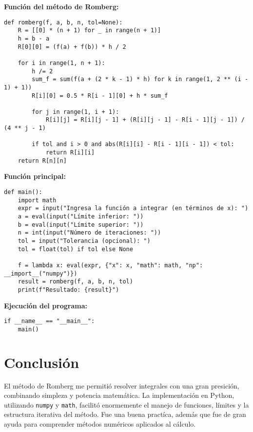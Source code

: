 \documentclass[12pt]{article}
\begin{document}
\textbf{Función del método de Romberg:}\\
\begin{lstlisting}
def romberg(f, a, b, n, tol=None):
    R = [[0] * (n + 1) for _ in range(n + 1)]
    h = b - a
    R[0][0] = (f(a) + f(b)) * h / 2

    for i in range(1, n + 1):
        h /= 2
        sum_f = sum(f(a + (2 * k - 1) * h) for k in range(1, 2 ** (i - 1) + 1))
        R[i][0] = 0.5 * R[i - 1][0] + h * sum_f

        for j in range(1, i + 1):
            R[i][j] = R[i][j - 1] + (R[i][j - 1] - R[i - 1][j - 1]) / (4 ** j - 1)

        if tol and i > 0 and abs(R[i][i] - R[i - 1][i - 1]) < tol:
            return R[i][i]
    return R[n][n]
\end{lstlisting}

\textbf{Función principal:}\\
\begin{lstlisting}
def main():
    import math
    expr = input("Ingresa la función a integrar (en términos de x): ")
    a = eval(input("Límite inferior: "))
    b = eval(input("Límite superior: "))
    n = int(input("Número de iteraciones: "))
    tol = input("Tolerancia (opcional): ")
    tol = float(tol) if tol else None

    f = lambda x: eval(expr, {"x": x, "math": math, "np": __import__("numpy")})
    result = romberg(f, a, b, n, tol)
    print(f"Resultado: {result}")
\end{lstlisting}

\textbf{Ejecución del programa:}\\
\begin{lstlisting}
if __name__ == "__main__":
    main()
\end{lstlisting}

\section*{ Conclusión}

El método de Romberg me permitió resolver integrales con una gran presición, combinando simpleza y potencia matemática. La implementación en Python, utilizando \texttt{numpy} y \texttt{math}, facilitó enormemente el manejo de funciones, límites y la estructura iterativa del método. Fue una buena practíca, además que fue de gran ayuda para comprender métodos numéricos aplicados al cálculo.
\end{document}

